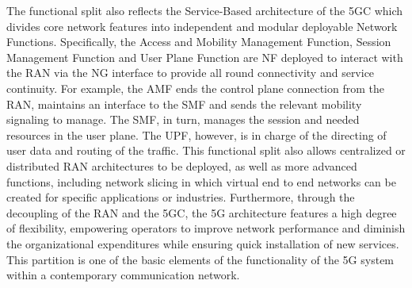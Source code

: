 \documentclass{report}
\begin{document}
The functional split also reflects the Service-Based architecture of the 5GC which divides core network features into independent and modular deployable Network Functions. Specifically, the Access and Mobility Management Function, Session Management Function and User Plane Function are NF deployed to interact with the RAN via the NG interface to provide all round connectivity and service continuity. For example, the AMF ends the control plane connection from the RAN, maintains an interface to the SMF and sends the relevant mobility signaling to manage. The SMF, in turn, manages the session and needed resources in the user plane. The UPF, however, is in charge of the directing of user data and routing of the traffic.\cite{wan_lei_2020} This functional split also allows centralized or distributed RAN architectures to be deployed, as well as more advanced functions, including network slicing in which virtual end to end networks can be created for specific applications or industries. Furthermore, through the decoupling of the RAN and the 5GC, the 5G architecture features a high degree of flexibility, empowering operators to improve network performance and diminish the organizational expenditures while ensuring quick installation of new services. This partition is one of the basic elements of the functionality of the 5G system within a contemporary communication network.
\end{document}
